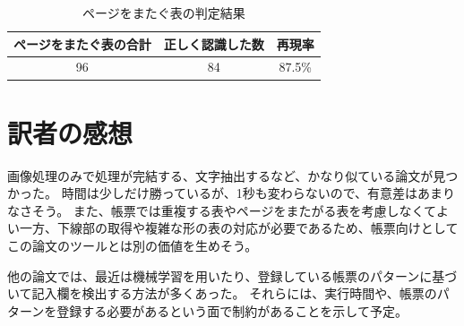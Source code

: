 \documentclass[uplatex, twocolumn,10pt]{jsarticle}
\begin{document}
\begin{table}[tp]
    \centering
    \caption{ページをまたぐ表の判定結果}
    \label{table3}
    \begin{tabular}{ccc}
        ページをまたぐ表の合計 & 正しく認識した数 & 再現率 \\
        \toprule
        96 & 84 & 87.5\% \\
    \end{tabular}
\end{table}








\section{訳者の感想}
画像処理のみで処理が完結する、文字抽出するなど、かなり似ている論文が見つかった。
時間は少しだけ勝っているが、1秒も変わらないので、有意差はあまりなさそう。
また、帳票では重複する表やページをまたがる表を考慮しなくてよい一方、下線部の取得や複雑な形の表の対応が必要であるため、帳票向けとしてこの論文のツールとは別の価値を生めそう。

他の論文では、最近は機械学習を用いたり、登録している帳票のパターンに基づいて記入欄を検出する方法が多くあった。
それらには、実行時間や、帳票のパターンを登録する必要があるという面で制約があることを示して予定。
\end{document}

